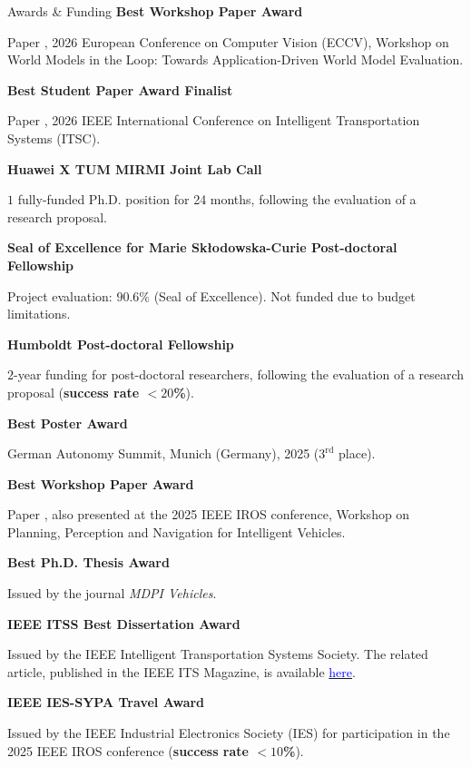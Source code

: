 \begin{rubric}{Awards \& Funding}
\entry*[09/2026]%
	\textbf{Best Workshop Paper Award} 
		\par Paper \cite{Wang2026_target}, 2026 European Conference on Computer Vision (ECCV), Workshop on World Models in the Loop: Towards Application-Driven World Model Evaluation.

\entry*[08/2026]%
	\textbf{Best Student Paper Award Finalist} 
		\par Paper \cite{Brusnicki2026_savant}, 2026 IEEE International Conference on Intelligent Transportation Systems (ITSC).

\entry*[06/2026]%
	\textbf{Huawei X TUM MIRMI Joint Lab Call}
    \par $1$ fully-funded Ph.D. position for 24 months, following the evaluation of a research proposal.

\entry*[02/2026]%
	\textbf{Seal of Excellence for Marie Sk{\l}odowska-Curie Post-doctoral Fellowship}
    \par Project evaluation: $90.6\%$ (Seal of Excellence). Not funded due to budget limitations. 

\entry*[12/2025]%
	\textbf{Humboldt Post-doctoral Fellowship} 
    \par $2$-year funding for post-doctoral researchers, following the evaluation of a research proposal (\textbf{success rate $<20$\%}).

\entry*[11/2025]%
	\textbf{Best Poster Award}
    \par German Autonomy Summit, Munich (Germany), 2025 ($3^{\mathrm{rd}}$ place).

\entry*[10/2025]%
	\textbf{Best Workshop Paper Award} 
		\par Paper \cite{Piccinini_A2RL_2025}, also presented at the 2025 IEEE IROS conference, Workshop on Planning, Perception and Navigation for Intelligent Vehicles.

\entry*[09/2025]%
	\textbf{Best Ph.D. Thesis Award} 
		\par Issued by the journal \textit{MDPI Vehicles}.

\entry*[08/2025]%
	\textbf{IEEE ITSS Best Dissertation Award} 
    \par Issued by the IEEE Intelligent Transportation Systems Society. The related article, published in the IEEE ITS Magazine, is available \href{https://ieeexplore.ieee.org/document/11429488/}{\textcolor{blue}{here}}.

\entry*[07/2025]%
	\textbf{IEEE IES-SYPA Travel Award} 
    \par Issued by the IEEE Industrial Electronics Society (IES) for participation in the 2025 IEEE IROS conference (\textbf{success rate $<10$\%}).


\end{rubric}
